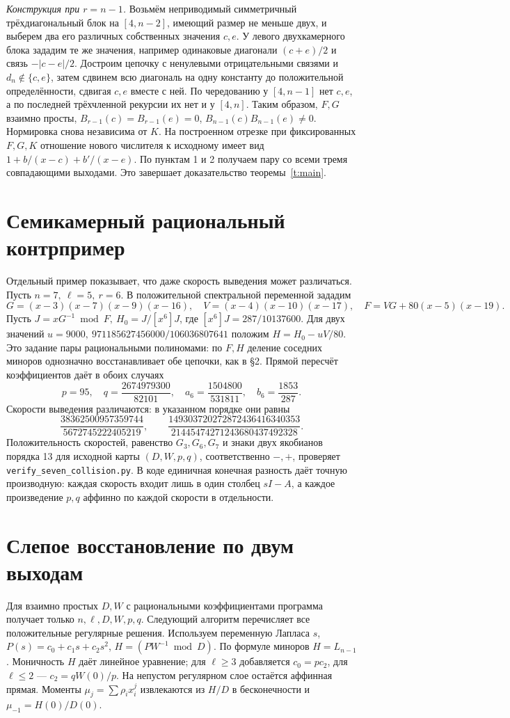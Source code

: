 \documentclass[11pt,a4paper]{article}
\begin{document}
\smallskip\noindent\textit{Конструкция при \(r=n-1\).}
Возьмём неприводимый симметричный трёхдиагональный блок на \([4,n-2]\), имеющий размер не меньше двух, и выберем два его различных собственных значения \(c,e\). У левого двухкамерного блока зададим те же значения, например одинаковые диагонали \((c+e)/2\) и связь \(-|c-e|/2\). Достроим цепочку с ненулевыми отрицательными связями и \(d_n\notin\{c,e\}\), затем сдвинем всю диагональ на одну константу до положительной определённости, сдвигая \(c,e\) вместе с ней. По чередованию у \([4,n-1]\) нет \(c,e\), а по последней трёхчленной рекурсии их нет и у \([4,n]\). Таким образом, \(F,G\) взаимно просты, \(B_{r-1}(c)=B_{r-1}(e)=0\), \(B_{n-1}(c)B_{n-1}(e)\ne0\). Нормировка снова независима от \(K\). На построенном отрезке при фиксированных \(F,G,K\) отношение нового числителя к исходному имеет вид \(1+b/(x-c)+b'/(x-e)\). По пунктам 1 и 2 получаем пару со всеми тремя совпадающими выходами. Это завершает доказательство теоремы~\ref{t:main}.

\section{Семикамерный рациональный контрпример}
Отдельный пример показывает, что даже скорость выведения может различаться. Пусть \(n=7,\ \ell=5,\ r=6\). В положительной спектральной переменной зададим
\[
 G=(x-3)(x-7)(x-9)(x-16),\quad V=(x-4)(x-10)(x-17),\quad
 F=VG+80(x-5)(x-19).
\]
Пусть \(J=xG^{-1}\bmod F,\ H_0=J/[x^6]J\), где \([x^6]J=287/10137600\).
Для двух значений \(u=9000,\ 971185627456000/106036807641\) положим
\(H=H_0-uV/80\). Это задание пары рациональными полиномами: по \(F,H\) деление соседних миноров однозначно восстанавливает обе цепочки, как в §2. Прямой пересчёт коэффициентов даёт в обоих случаях
\[
 p=95,\quad q=\frac{2674979300}{82101},\quad
 a_6=\frac{1504800}{531811},\quad b_6=\frac{1853}{287}.
\]
Скорости выведения различаются: в указанном порядке они равны
\[
  \frac{38362500957359744}{5672745222405219},\qquad
  \frac{149303720272872436416340353}{21445474271243680437492328}.
\]
Положительность скоростей, равенство \(G_3,G_6,G_7\) и знаки двух якобианов порядка 13 для исходной карты \((D,W,p,q)\), соответственно \(-,+\), проверяет \texttt{verify\_seven\_collision.py}. В коде единичная конечная разность даёт точную производную: каждая скорость входит лишь в один столбец \(sI-A\), а каждое произведение \(p,q\) аффинно по каждой скорости в отдельности.

\newpage
\section{Слепое восстановление по двум выходам}
Для взаимно простых \(D,W\) с рациональными коэффициентами программа получает только \(n,\ell,D,W,p,q\). Следующий алгоритм перечисляет все положительные регулярные решения. Используем переменную Лапласа \(s\), \(P(s)=c_0+c_1s+c_2s^2\), \(H=(P W^{-1}\bmod D)\). По формуле миноров \(H=L_{n-1}\). Моничность \(H\) даёт линейное уравнение; для \(\ell\ge3\) добавляется \(c_0=pc_2\), для \(\ell\le2\) --- \(c_2=qW(0)/p\). На непустом регулярном слое остаётся аффинная прямая. Моменты \(\mu_j=\sum\rho_i x_i^j\) извлекаются из \(H/D\) в бесконечности и \(\mu_{-1}=H(0)/D(0)\).
\end{document}
